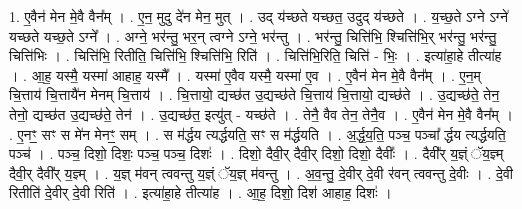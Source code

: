 \documentclass[17pt]{extarticle}
\begin{document}
1. ए॒वैन॑ मेन मे॒वै वैन᳚म् । . ए॒न॒ मुदु दे॑न मेन॒ मुत् । . उद् य॑च्छते यच्छत॒ उदुद् य॑च्छते । . य॒च्छ॒ते ऽग्ने ऽग्ने॑ यच्छते यच्छ॒ते ऽग्ने᳚ । . अग्ने॒ भर॑न्तु॒ भर॒न् त्वग्ने ऽग्ने॒ भर॑न्तु । . भर॑न्तु॒ चित्ति॑भि॒ श्चित्ति॑भि॒र् भर॑न्तु॒ भर॑न्तु॒ चित्ति॑भिः । . चित्ति॑भि॒ रितीति॒ चित्ति॑भि॒ श्चित्ति॑भि॒ रिति॑ । . चित्ति॑भि॒रिति॒ चित्ति॑ - भिः॒ । . इत्या॑हा॒हे तीत्या॑ह । . आ॒ह॒ यस्मै॒ यस्मा॑ आहाह॒ यस्मै᳚ । . यस्मा॑ ए॒वैव यस्मै॒ यस्मा॑ ए॒व । . ए॒वैन॑ मेन मे॒वै वैन᳚म् । . ए॒न॒म् चि॒त्ताय॑ चि॒त्तायै॑न मेनम् चि॒त्ताय॑ । . चि॒त्तायो॒ द्यच्छ॑त उ॒द्यच्छ॑ते चि॒त्ताय॑ चि॒त्तायो॒ द्यच्छ॑ते । . उ॒द्यच्छ॑ते॒ तेन॒ तेनो॒ द्यच्छ॑त उ॒द्यच्छ॑ते॒ तेन॑ । . उ॒द्यच्छ॑त॒ इत्यु॑त् - यच्छ॑ते । . तेनै॒ वैव तेन॒ तेनै॒व । . ए॒वैन॑ मेन मे॒वै वैन᳚म् । . ए॒नꣳ॒॒ सꣳ स मे॑न मेनꣳ॒॒ सम् । . स म॑र्द्धय त्यर्द्धयति॒ सꣳ स म॑र्द्धयति । . अ॒र्द्ध॒य॒ति॒ पञ्च॒ पञ्चा᳚ र्द्धय त्यर्द्धयति॒ पञ्च॑ । . पञ्च॒ दिशो॒ दिशः॒ पञ्च॒ पञ्च॒ दिशः॑ । . दिशो॒ दैवी॒र् दैवी॒र् दिशो॒ दिशो॒ दैवीः᳚ । . दैवी᳚र् य॒ज्ञ्ं ॅय॒ज्ञ्म् दैवी॒र् दैवी᳚र् य॒ज्ञ्म् । . य॒ज्ञ् म॑वन् त्ववन्तु य॒ज्ञ्ं ॅय॒ज्ञ् म॑वन्तु । . अ॒व॒न्तु॒ दे॒वीर् दे॒वी र॑वन् त्ववन्तु दे॒वीः । . दे॒वी रितीति॑ दे॒वीर् दे॒वी रिति॑ । . इत्या॑हा॒हे तीत्या॑ह । . आ॒ह॒ दिशो॒ दिश॑ आहाह॒ दिशः॑ । \newline
\end{document}
